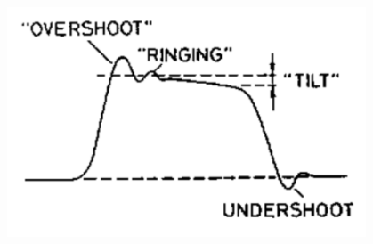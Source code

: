 \documentclass{beamer}
\begin{document}
\begin{frame}
\begin{columns}
\begin{column}{0.5\textwidth}
\begin{center}
{\includegraphics[width=0.8\textwidth]{d2/parametros_pulso2}}
\end{center}
\end{column}
\end{columns}
\end{frame} 
\end{document}

